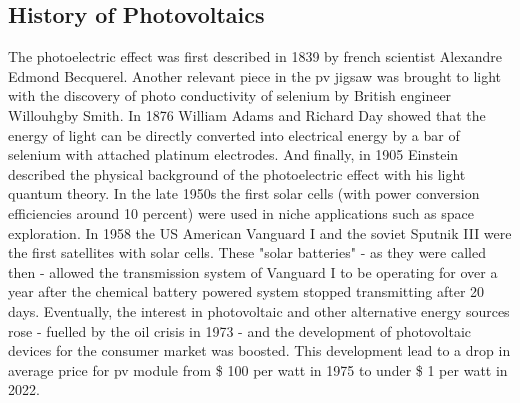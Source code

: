 \subsection{History of Photovoltaics}
The photoelectric effect was first described in 1839 by french scientist Alexandre 
Edmond \linebreak[4] 
Becquerel\cite{becquerel1839memoire}. %
Another relevant piece in the \gls{pv} jigsaw was brought to light
with the discovery of photo conductivity of selenium
by British engineer Willouhgby Smith\cite{Smith1873Selenium}.
In 1876 William Adams and Richard Day\cite{Adams1876Selenium} showed that 
the energy of light can be directly converted into electrical energy by a bar of 
selenium with attached platinum electrodes.
And finally, in 1905 Einstein described the physical background of the photoelectric 
effect with his light quantum theory\cite{einstein1905erzeugung}.
In the late 1950s the first solar cells (with power conversion efficiencies around 10 percent\cite{prince1958}) were used in niche applications such as space exploration.  
In 1958 the US American Vanguard I\cite{vanguard2004} and the soviet Sputnik III\cite{sputnik1959} were the first satellites with solar cells.
These "solar batteries" - as they were called then - allowed the transmission system of Vanguard I to be operating for over a year after the chemical battery powered system stopped transmitting after 20 days\cite{vanguard2004}. 
%
Eventually, the interest in photovoltaic and other alternative energy sources 
rose - fuelled by the oil crisis in 1973 - 
and the development of photovoltaic devices for the consumer market was boosted. 
This development lead to a drop in 
average price for \gls{pv} module from \$ 100 per watt in 1975 
to under \$ 1 per watt in 2022\cite{irena2023renewable}.

